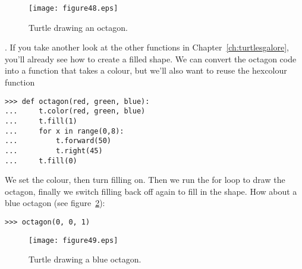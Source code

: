 \begin{figure}
\begin{center}
\texttt{[image: figure48.eps]}
\end{center}
\caption{Turtle drawing an octagon.}\label{fig48}
\end{figure}

.  If you take another look at the other functions in Chapter~\ref{ch:turtlesgalore}, you'll already see how to create a filled shape. We can convert the octagon code into a function that takes a colour, but we'll also want to reuse the hexcolour function 

\begin{listing}
\begin{verbatim}
>>> def octagon(red, green, blue):
...     t.color(red, green, blue)
...     t.fill(1)
...     for x in range(0,8):
...         t.forward(50)
...         t.right(45)
...     t.fill(0)
\end{verbatim}
\end{listing}

We set the colour, then turn filling on.  Then we run the for loop to draw the octagon, finally we switch filling back off again to fill in the shape. How about a blue octagon (see figure~\ref{fig49}):

\begin{listing}
\begin{verbatim}
>>> octagon(0, 0, 1)
\end{verbatim}
\end{listing}

\begin{figure}
\begin{center}
\texttt{[image: figure49.eps]}
\end{center}
\caption{Turtle drawing a blue octagon.}\label{fig49}
\end{figure}
\newpage
